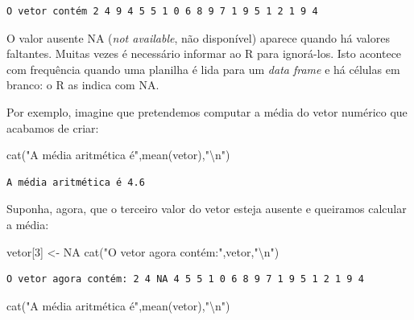 \documentclass[
]{article}
\newenvironment{Shaded}{\begin{snugshade}}{\end{snugshade}}
\newcommand{\ConstantTok}[1]{\textcolor[rgb]{0.00,0.00,0.00}{#1}}
\newcommand{\DecValTok}[1]{\textcolor[rgb]{0.00,0.00,0.81}{#1}}
\newcommand{\FunctionTok}[1]{\textcolor[rgb]{0.00,0.00,0.00}{#1}}
\newcommand{\NormalTok}[1]{#1}
\newcommand{\OtherTok}[1]{\textcolor[rgb]{0.56,0.35,0.01}{#1}}
\newcommand{\SpecialCharTok}[1]{\textcolor[rgb]{0.00,0.00,0.00}{#1}}
\newcommand{\StringTok}[1]{\textcolor[rgb]{0.31,0.60,0.02}{#1}}
\begin{document}
\begin{verbatim}
O vetor contém 2 4 9 4 5 5 1 0 6 8 9 7 1 9 5 1 2 1 9 4 
\end{verbatim}

O valor ausente NA (\emph{not available}, não disponível) aparece quando
há valores faltantes. Muitas vezes é necessário informar ao R para
ignorá-los. Isto acontece com frequência quando uma planilha é lida para
um \emph{data frame} e há células em branco: o R as indica com NA.

Por exemplo, imagine que pretendemos computar a média do vetor numérico
que acabamos de criar:

\begin{Shaded}
\begin{Highlighting}[]
\FunctionTok{cat}\NormalTok{(}\StringTok{"A média aritmética é"}\NormalTok{,}\FunctionTok{mean}\NormalTok{(vetor),}\StringTok{"}\SpecialCharTok{\textbackslash{}n}\StringTok{"}\NormalTok{)}
\end{Highlighting}
\end{Shaded}

\begin{verbatim}
A média aritmética é 4.6 
\end{verbatim}

Suponha, agora, que o terceiro valor do vetor esteja ausente e queiramos
calcular a média:

\begin{Shaded}
\begin{Highlighting}[]
\NormalTok{vetor[}\DecValTok{3}\NormalTok{] }\OtherTok{\textless{}{-}} \ConstantTok{NA}
\FunctionTok{cat}\NormalTok{(}\StringTok{"O vetor agora contém:"}\NormalTok{,vetor,}\StringTok{"}\SpecialCharTok{\textbackslash{}n}\StringTok{"}\NormalTok{)}
\end{Highlighting}
\end{Shaded}

\begin{verbatim}
O vetor agora contém: 2 4 NA 4 5 5 1 0 6 8 9 7 1 9 5 1 2 1 9 4 
\end{verbatim}

\begin{Shaded}
\begin{Highlighting}[]
\FunctionTok{cat}\NormalTok{(}\StringTok{"A média aritmética é"}\NormalTok{,}\FunctionTok{mean}\NormalTok{(vetor),}\StringTok{"}\SpecialCharTok{\textbackslash{}n}\StringTok{"}\NormalTok{)}
\end{Highlighting}
\end{Shaded}
\end{document}
